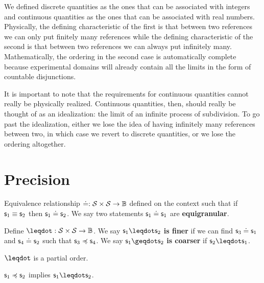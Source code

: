 \documentclass[11pt,letterpaper,fleqn]{memoir} %
\begin{document}
We defined discrete quantities as the ones that can be associated with integers and continuous quantities as the ones that can be associated with real numbers. Physically, the defining characteristic of the first is that between two references we can only put finitely many references while the defining characteristic of the second is that between two references we can always put infinitely many. Mathematically, the ordering in the second case is automatically complete because experimental domains will already contain all the limits in the form of countable disjunctions.

It is important to note that the requirements for continuous quantities cannot really be physically realized. Continuous quantities, then, should really be thought of as an idealization: the limit of an infinite process of subdivision. To go past the idealization, either we lose the idea of having infinitely many references between two, in which case we revert to discrete quantities, or we lose the ordering altogether.

\chapter{Precision}

\def\eqgran{\doteq}
\def\finer{\leqdot}
\def\coarser{\geqdot}
\def\sfiner{\lessdot}
\def\scoarser{\gtrdot}


\begin{axiom}
	Equivalence relationship $\eqgran : \logCtx \times \logCtx \to \Bool$ defined on the context such that if $\mathsf{s}_1 \equiv \mathsf{s}_2$ then $\stmt_1 \eqgran \stmt_2$. We say two statements $\stmt_1 \eqgran \stmt_1$ are \textbf{equigranular}.
\end{axiom}

\begin{defn}
	Define $\finer : \logCtx \times \logCtx \to \Bool$. We say $\stmt_1 \finer \stmt_2$ \textbf{is finer} if we can find $\stmt_3 \eqgran \stmt_1$ and $\stmt_4 \eqgran \stmt_2$ such that $\mathsf{s}_3 \preccurlyeq \mathsf{s}_4$. We say $\stmt_1 \coarser \stmt_2$ \textbf{is coarser} if $\stmt_2 \finer \stmt_1$.
\end{defn}

\begin{prop}
	$\finer$ is a partial order.
\end{prop}

\begin{coro}
	$\mathsf{s}_1 \preccurlyeq \mathsf{s}_2$ implies $\stmt_1 \finer \stmt_2$.
\end{coro}
\end{document}
